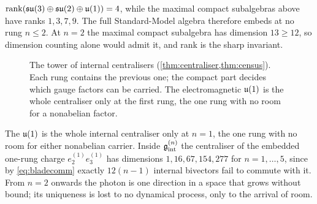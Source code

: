 \begin{lemma}
\label{lem:rank}
$\operatorname{rank}(\mathfrak{su}(3)\oplus\mathfrak{su}(2)\oplus\mathfrak{u}(1))=4$, while the maximal compact subalgebras above have ranks $1,3,7,9$. The full Standard-Model
algebra therefore embeds at no rung $n\le2$. At $n=2$ the maximal compact subalgebra has dimension $13\ge12$, so dimension counting
alone would admit it, and rank is the sharp invariant.
\end{lemma}

\begin{figure}[t]
\centering
{}
\caption{The tower of internal centralisers (\cref{thm:centraliser,thm:census}). Each rung contains the previous one; the compact part
decides which gauge factors can be carried. The electromagnetic $\mathfrak{u}(1)$ is the whole centraliser only at the first rung, the one rung
with no room for a nonabelian factor.}
\label{fig:tower}
\end{figure}

\begin{corollary}
\label{cor:tradeoff}
The $\mathfrak{u}(1)$ is the whole internal centraliser only at $n=1$, the one rung with no room for either nonabelian carrier. Inside
$\mathfrak g_{\rm int}^{(n)}$ the centraliser of the embedded one-rung charge $e^{(1)}_2e^{(1)}_3$ has dimensions $1,16,67,154,277$ for $n=1,\dots,5$,
since by \eqref{eq:bladecomm} exactly $12(n-1)$ internal bivectors fail to commute with it. From $n=2$ onwards the photon is one
direction in a space that grows without bound; its uniqueness is lost to no dynamical process, only to the arrival of room.
\end{corollary}

